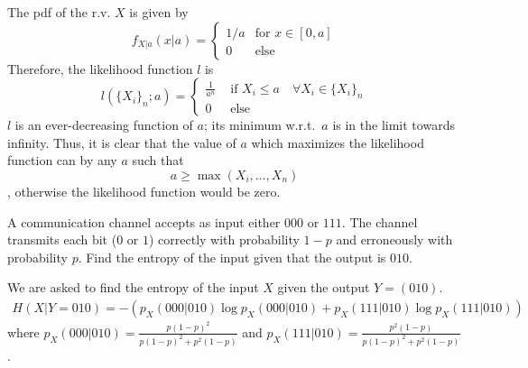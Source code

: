 \documentclass{article}
\begin{document}
    \begin{solution}
    The pdf of the r.v. $X$ is given by
    \begin{equation*}
        f_{X|a}(x|a) = \begin{cases}
                        1/a & \text{for } x \in [0, a] \\
                        0 & \text{else}
                        \end{cases}
    \end{equation*}
    Therefore, the likelihood function $l$ is
    \begin{equation}
        l(\{X_i\}_n; a) = \begin{cases} 
        \frac{1}{a^n} & \text{ if } X_i \leq a \quad \forall X_i \in \{X_i\}_n \\
        0 & \text{ else}
        \end{cases}
    \end{equation}
    $l$ is an ever-decreasing function of $a$; its minimum w.r.t.~$a$ is in the limit towards infinity.
    Thus, it is clear that the value of $a$ which maximizes the likelihood function can by any $a$ such that
    \begin{equation}
        a \geq \max(X_i, \ldots, X_n)
    \end{equation}
    , otherwise the likelihood function would be zero.
    \end{solution}

    \nextproblem

    \begin{problem}
        A communication channel accepts as input either $000$ or $111$. The channel transmits each bit ($0$ or $1$) correctly with probability $1 - p$ and erroneously with probability $p$. Find the entropy of the input given that the output is $010$.
    \end{problem}

    \begin{solution}
        We are asked to find the entropy of the input $X$ given the output $Y = (010)$.
        \begin{align}
            H(X|Y=010) = -(p_X(000|010) \log p_X(000|010) + p_X(111|010) \log{p_X(111|010)})
        \end{align}
        where $p_X(000|010) = \frac{p(1-p)^2}{p(1-p)^2 + p^2(1-p)}$ and $p_X(111|010) = \frac{p^2(1-p)}{p(1-p)^2 +  p^2(1-p)}$.
    \end{solution}

    \nextproblem
\end{document}
